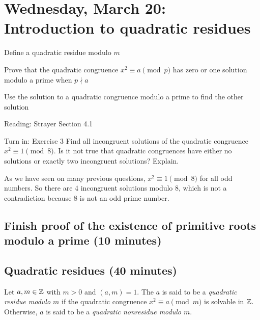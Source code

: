 \documentclass[letterpaper, 11 pt]{ximera}
\theoremstyle{definition}
\begin{document}
\section{Wednesday, March 20: Introduction to quadratic residues}

\begin{obj}
    \item Define a quadratic residue modulo $m$
    \item Prove that the quadratic congruence $x^2\equiv a\pmod{p}$ has zero or one solution modulo a prime when $p\nmid a$
    \item Use the solution to a quadratic congruence modulo a prime to find the other solution
\end{obj}


\begin{pre}
    \item[Reading:] Strayer Section 4.1
    \item[Turn in:] Exercise 3
     Find all incongruent solutions of the quadratic congruence $x^2\equiv 1\pmod{8}.$ Is it not true that quadratic congruences have either no solutions or exactly two incongruent solutions? Explain.

     \begin{solution}
        As we have seen on many previous questions, $x^2\equiv 1\pmod{8}$ for all odd numbers. So there are $4$ incongruent solutions modulo $8$, which is not a contradiction because $8$ is not an odd prime number.
     \end{solution}
\end{pre}

\subsection{Finish proof of the existence of primitive roots modulo a prime (10 minutes)}

\subsection{Quadratic residues (40 minutes)}


\begin{definition}\label{defn:quad-residue}
    Let $a,m\in\mathbb Z$ with $m>0$ and $(a,m)=1.$ The $a$ is said to be a \emph{quadratic residue modulo $m$} if the quadratic congruence $x^2\equiv a\pmod{m}$ is solvable in $\mathbb Z.$ Otherwise, $a$ is said to be a \emph{quadratic nonresidue modulo $m$}.
\end{definition}
\end{document}
